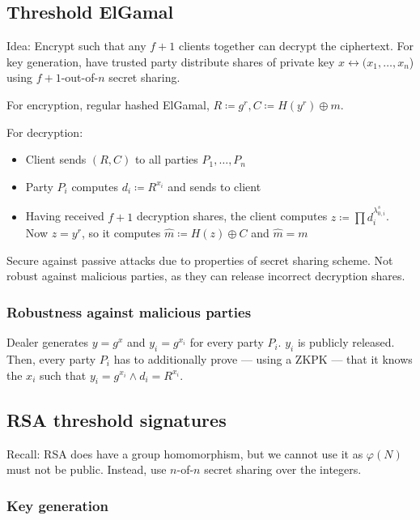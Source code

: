 \subsection{Threshold ElGamal}

Idea: Encrypt such that any $f+1$ clients together can decrypt the ciphertext.
For key generation, have trusted party distribute shares of private key $x
\leftrightarrow (x_1, \ldots, x_n$) using $f+1$-out-of-$n$ secret sharing.

For encryption, regular hashed ElGamal, $R \coloneqq g^r, C \coloneqq H(y^r)
\oplus m$.

For decryption:
\begin{itemize}
		\item Client sends $(R, C)$ to all parties $P_1, \ldots, P_n$
		\item Party $P_i$ computes $d_i \coloneqq R^{x_i}$ and sends to client
		\item Having received $f+1$ decryption shares, the client computes $z
				\coloneqq \prod d_i^{\lambda^s_{0,i}}$. Now $z = y^r$, so it
				computes $\hat{m} \coloneqq H(z) \oplus C$ and $\hat{m} = m$
\end{itemize}

Secure against passive attacks due to properties of secret sharing scheme. Not
robust against malicious parties, as they can release incorrect decryption
shares.

\subsubsection{Robustness against malicious parties}

Dealer generates $y = g^x$ and $y_i = g^{x_i}$ for every party $P_i$. $y_i$ is
publicly released. Then, every party $P_i$ has to additionally prove --- using
a ZKPK --- that it knows the $x_i$ such that $y_i = g^{x_i} \land d_i =
R^{x_i}$.

\subsection{RSA threshold signatures}

Recall: RSA does have a group homomorphism, but we cannot use it as $\varphi(N)$
must not be public. Instead, use $n$-of-$n$ secret sharing over the integers.

\subsubsection{Key generation}

